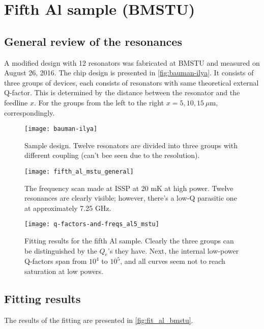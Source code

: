 \documentclass[12pt]{article}
\numberwithin{equation}{section}
\numberwithin{figure}{section}
\begin{document}
\newpage
\section{Fifth Al sample (BMSTU)}

\subsection{General review of the resonances}

A modified design with 12 resonators was fabricated at BMSTU and measured on August 26, 2016. The chip design is presented in \autoref{fig:bauman-ilya}. It consists of three groups of devices, each consists of resonators with same theoretical external Q-factor. This is determined by the distance between the resonator and the feedline $x$. For the groups from the left to the right $x = 5, 10, 15\ \mu$m, correspondingly.

\begin{figure}[h]
\centering
\texttt{[image: bauman-ilya]}
\caption{Sample design. Twelve resonators are divided into three groups with different coupling (can't bee seen due to the resolution).}
\label{fig:bauman-ilya}
\end{figure}


\begin{figure}[h]
\centering
\texttt{[image: fifth\_al\_mstu\_general]}
\caption{The frequency scan made at ISSP at 20 mK at high power. Twelve resonances are clearly visible; however, there's a low-Q parasitic one at approximately 7.25 GHz.}
\end{figure}


\begin{figure}
\centering
\texttt{[image: q-factors-and-freqs\_al5\_mstu]}
\caption{Fitting results for the fifth Al sample. Clearly the three groups can be distinguished by the $Q_e$'s they have. Next, the internal low-power Q-factors span from $10^4$ to $10^5$, and all curves seem not to reach saturation at low powers.}
\label{fig:fit_al_bmstu}
\end{figure}

\subsection{Fitting results}

The results of the fitting are presented in \autoref{fig:fit_al_bmstu}.
\end{document}
